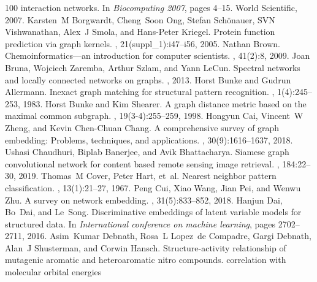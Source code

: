 \begin{thebibliography}{100}
  interaction networks.
\newblock In {\em Biocomputing 2007}, pages 4--15. World Scientific, 2007.
Karsten~M Borgwardt, Cheng~Soon Ong, Stefan Sch{\"o}nauer, SVN Vishwanathan,
  Alex~J Smola, and Hans-Peter Kriegel.
\newblock Protein function prediction via graph kernels.
, 21(suppl\_1):i47--i56, 2005.
Nathan Brown.
\newblock Chemoinformatics—an introduction for computer scientists.
, 41(2):8, 2009.
Joan Bruna, Wojciech Zaremba, Arthur Szlam, and Yann LeCun.
\newblock Spectral networks and locally connected networks on graphs.
, 2013.
Horst Bunke and Gudrun Allermann.
\newblock Inexact graph matching for structural pattern recognition.
, 1(4):245--253, 1983.
Horst Bunke and Kim Shearer.
\newblock A graph distance metric based on the maximal common subgraph.
, 19(3-4):255--259, 1998.
Hongyun Cai, Vincent~W Zheng, and Kevin Chen-Chuan Chang.
\newblock A comprehensive survey of graph embedding: Problems, techniques, and
  applications.
,
  30(9):1616--1637, 2018.
Ushasi Chaudhuri, Biplab Banerjee, and Avik Bhattacharya.
\newblock Siamese graph convolutional network for content based remote sensing
  image retrieval.
, 184:22--30, 2019.
Thomas~M Cover, Peter Hart, et~al.
\newblock Nearest neighbor pattern classification.
, 13(1):21--27, 1967.
Peng Cui, Xiao Wang, Jian Pei, and Wenwu Zhu.
\newblock A survey on network embedding.
,
  31(5):833--852, 2018.
Hanjun Dai, Bo~Dai, and Le~Song.
\newblock Discriminative embeddings of latent variable models for structured
  data.
\newblock In {\em International conference on machine learning}, pages
  2702--2711, 2016.
Asim~Kumar Debnath, Rosa~L Lopez~de Compadre, Gargi Debnath, Alan~J Shusterman,
  and Corwin Hansch.
\newblock Structure-activity relationship of mutagenic aromatic and
  heteroaromatic nitro compounds. correlation with molecular orbital energies

\end{thebibliography}
